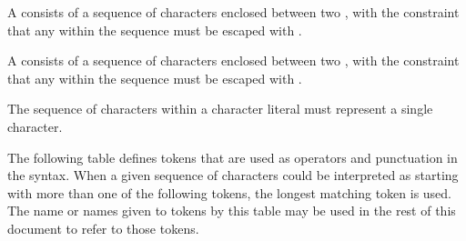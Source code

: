 
A  consists of a sequence of characters enclosed between two , with the constraint that any  within the sequence must be escaped with \Char{\\}.


A  consists of a sequence of characters enclosed between two , with the constraint that any  within the sequence must be escaped with \Char{\\}.

The sequence of characters within a character literal must represent a single character.


The following table defines tokens that are used as operators and punctuation in the syntax.
When a given sequence of characters could be interpreted as starting with more than one of the following tokens, the longest matching token is used.
The name or names given to tokens by this table may be used in the rest of this document to refer to those tokens.


